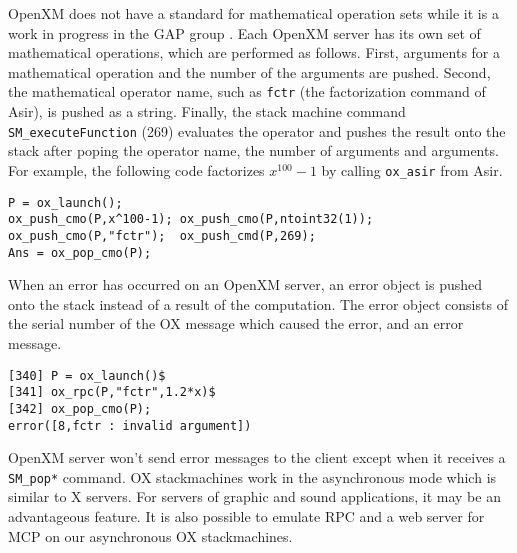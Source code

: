 OpenXM does not have a standard for mathematical operation sets
while it is a work in progress in the GAP group \cite{gap}.
Each OpenXM server has its own set of mathematical operations,
which are performed as follows.
First, arguments for a mathematical operation
and the number of the arguments are pushed.
Second, 
the mathematical operator name, 
such as {\tt fctr} (the factorization command of Asir),
is pushed as a string.
Finally, the stack machine command
{\tt SM\_executeFunction} (269) evaluates the operator and
pushes the result onto the stack
after poping the operator name, the number of arguments
and arguments.
For example, the following code factorizes $x^{100}-1$ by calling
{\tt ox\_asir} from Asir.
\begin{verbatim}
P = ox_launch(); 
ox_push_cmo(P,x^100-1); ox_push_cmo(P,ntoint32(1));
ox_push_cmo(P,"fctr");  ox_push_cmd(P,269); 
Ans = ox_pop_cmo(P);
\end{verbatim}

When an error has occurred on an OpenXM server,
an error object is pushed onto the stack 
instead of a result of the computation.
The error object consists of the serial number of the OX message
which caused the error, and an error message.
\begin{verbatim}
[340] P = ox_launch()$
[341] ox_rpc(P,"fctr",1.2*x)$
[342] ox_pop_cmo(P);
error([8,fctr : invalid argument])
\end{verbatim}

OpenXM server won't send error messages to the client
except when it receives a {\tt SM\_pop*} command.
OX stackmachines work in the asynchronous mode which is similar 
to X servers.
For servers of graphic and sound applications, 
it may be an advantageous feature.
It is also possible to emulate RPC and a web server for MCP \cite{iamc} 
on our asynchronous OX stackmachines.





